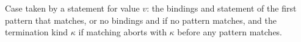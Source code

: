 Case taken by a  statement for value $v$: the bindings and statement of the first pattern that
matches, or no bindings and  if no pattern matches, and the termination kind $\kappa$ if matching aborts with $\kappa$ before any pattern matches.
